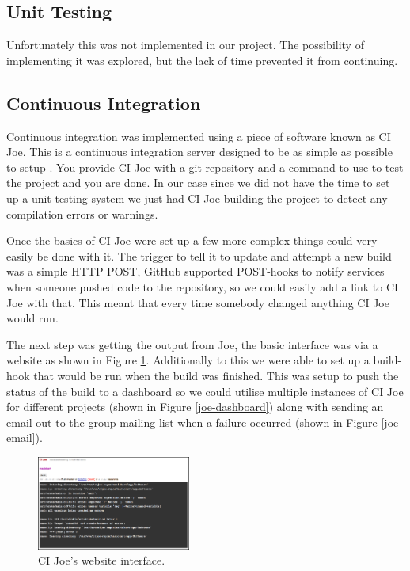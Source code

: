   \subsection{Unit Testing}

    Unfortunately this was not implemented in our project.  The possibility of
    implementing it was explored, but the lack of time prevented it from
    continuing.

  \subsection{Continuous Integration}

    Continuous integration was implemented using a piece of software known as CI
    Joe.  This is a continuous integration server designed to be as simple as
    possible to setup \cite{ci-joe}.  You provide CI Joe with a git repository and a command
    to use to test the project and you are done.  In our case since we did not
    have the time to set up a unit testing system we just had CI Joe building
    the project to detect any compilation errors or warnings.

    Once the basics of CI Joe were set up a few more complex things could very
    easily be done with it.  The trigger to tell it to update and attempt a new
    build was a simple HTTP POST, GitHub supported POST-hooks to notify services
    when someone pushed code to the repository, so we could easily add a link to
    CI Joe with that.  This meant that every time somebody changed anything CI
    Joe would run.

    The next step was getting the output from Joe, the basic interface was via a
    website as shown in Figure \ref{joe-website}.  Additionally to this we were
    able to set up a build-hook that would be run when the build was finished.
    This was setup to push the status of the build to a dashboard so we could
    utilise multiple instances of CI Joe for different projects (shown in Figure
    \ref{joe-dashboard}) along with sending an email out to the group mailing
    list when a failure occurred (shown in Figure \ref{joe-email}).

    \begin{figure}
    \centering
    \includegraphics[width=0.45\textwidth]{images/joe-website}
    \caption{CI Joe's website interface.}
    \label{joe-website}
    \end{figure}

